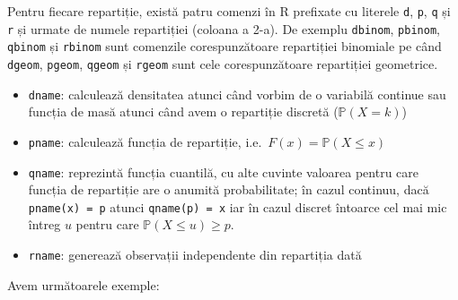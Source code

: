 \documentclass[]{article}
\begin{document}
Pentru fiecare repartiție, există patru comenzi în R prefixate cu
literele \texttt{d}, \texttt{p}, \texttt{q} și \texttt{r} și urmate de
numele repartiției (coloana a 2-a). De exemplu \texttt{dbinom},
\texttt{pbinom}, \texttt{qbinom} și \texttt{rbinom} sunt comenzile
corespunzătoare repartiției binomiale pe când \texttt{dgeom},
\texttt{pgeom}, \texttt{qgeom} și \texttt{rgeom} sunt cele
corespunzătoare repartiției geometrice.

\begin{itemize}
\item
  \texttt{dname}: calculează densitatea atunci când vorbim de o
  variabilă continue sau funcția de masă atunci când avem o repartiție
  discretă (\(\mathbb{P}(X=k)\))
\item
  \texttt{pname}: calculează funcția de repartiție,
  i.e.~\(F(x)=\mathbb{P}(X\leq x)\)
\item
  \texttt{qname}: reprezintă funcția cuantilă, cu alte cuvinte valoarea
  pentru care funcția de repartiție are o anumită probabilitate; în
  cazul continuu, dacă \texttt{pname(x)\ =\ p} atunci
  \texttt{qname(p)\ =\ x} iar în cazul discret întoarce cel mai mic
  întreg \(u\) pentru care \(\mathbb{P}(X\leq u)\geq p\).
\item
  \texttt{rname}: generează observații independente din repartiția dată
\end{itemize}

Avem următoarele exemple:
\end{document}
